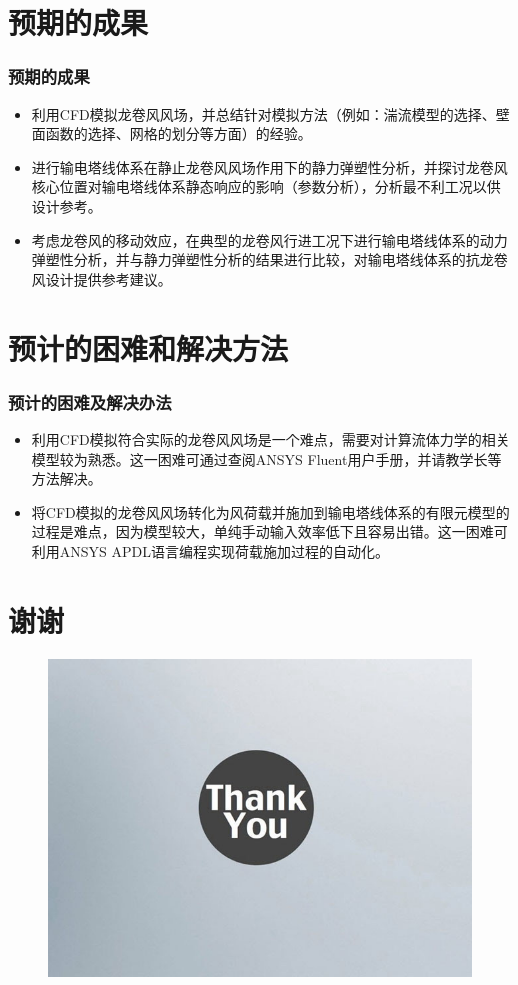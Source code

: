 \documentclass[]{beamer}
\begin{document}
\section{预期的成果}
\begin{frame}
  \frametitle{预期的成果}
  \begin{itemize}
  	\item<1->
  	利用CFD模拟龙卷风风场，并总结针对模拟方法（例如：湍流模型的选择、壁面函数的选择、网格的划分等方面）的经验。
  	\item<2->
  	进行输电塔线体系在静止龙卷风风场作用下的静力弹塑性分析，并探讨龙卷风核心位置对输电塔线体系静态响应的影响（参数分析），分析最不利工况以供设计参考。
  	\item<3->
  	考虑龙卷风的移动效应，在典型的龙卷风行进工况下进行输电塔线体系的动力弹塑性分析，并与静力弹塑性分析的结果进行比较，对输电塔线体系的抗龙卷风设计提供参考建议。
  \end{itemize}
\end{frame}

\section{预计的困难和解决方法} 
\begin{frame}
  \frametitle{预计的困难及解决办法}
  \begin{itemize}
  	\item<1->
  	利用CFD模拟符合实际的龙卷风风场是一个难点，需要对计算流体力学的相关模型较为熟悉。这一困难可通过查阅ANSYS Fluent用户手册，并请教学长等方法解决。
  	\item<2->
  	将CFD模拟的龙卷风风场转化为风荷载并施加到输电塔线体系的有限元模型的过程是难点，因为模型较大，单纯手动输入效率低下且容易出错。这一困难可利用ANSYS APDL语言编程实现荷载施加过程的自动化。
  \end{itemize}
\end{frame}


\section*{谢谢}
\begin{frame}
	\begin{figure}
		\centering
		\includegraphics[width=\textwidth]{./fig/thank_you.jpg}
	\end{figure}
\end{frame}
\end{document}
